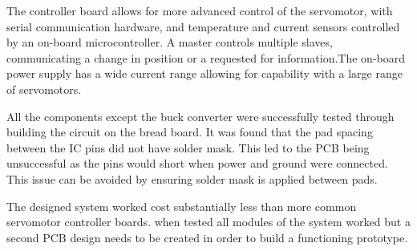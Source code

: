 \documentclass[a4paper,12pt]{report}
\begin{document}
The controller board allows for more advanced control of the servomotor, with serial communication hardware, and temperature and current sensors controlled by an on-board microcontroller. A master controls multiple slaves, communicating a change in position or a requested for information.The on-board power supply has a wide current range allowing for capability with a large range of servomotors.

All the components except the buck converter were successfully tested through building the circuit on the bread board. It was found that the pad spacing between the IC pins did not have solder mask. This led to the PCB being unsuccessful as the pins would short when power and ground were connected. This issue can be avoided by ensuring solder mask is applied between pads.

The designed system worked cost substantially less than more common servomotor controller boards. when tested all modules of the system worked but a second PCB design needs to be created in order to build a functioning prototype.
\endgroup
\vspace*{\fill}











\tableofcontents


\newpage
\listoffigures

\newpage
\listoftables















\end{document}
